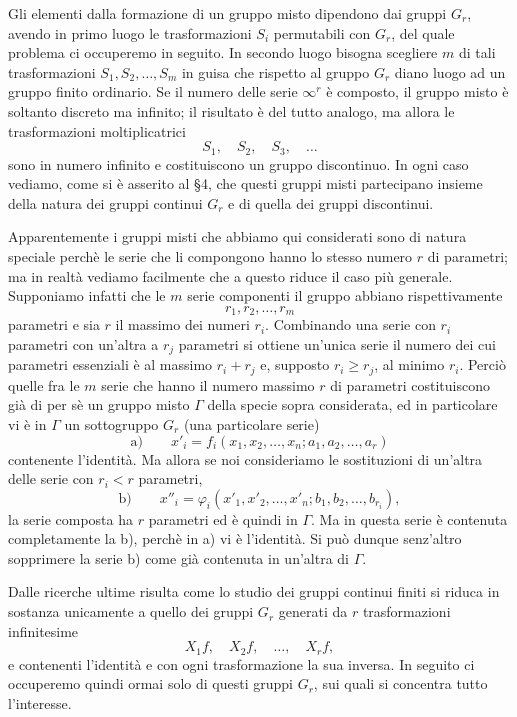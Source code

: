 \documentclass[11pt]{book}
\begin{document}
Gli elementi dalla formazione di un gruppo misto dipendono dai gruppi $G_r$, avendo in primo luogo le trasformazioni $S_i$ permutabili con $G_r$, del quale problema ci occuperemo in seguito. In secondo luogo bisogna scegliere $m$ di tali trasformazioni $S_1,S_2,\ldots,S_m$ in guisa che rispetto al gruppo $G_r$ diano luogo ad un gruppo finito ordinario. Se il numero delle serie $\infty^r$ è composto, il gruppo misto è soltanto discreto ma infinito; il risultato è del tutto analogo, ma allora le trasformazioni moltiplicatrici
\[
 S_1,
 \quad S_2,
 \quad S_3,
 \quad \ldots
\]
sono in numero infinito e costituiscono un gruppo discontinuo. In ogni caso vediamo, come si è asserito al \S{}4, che questi gruppi misti partecipano insieme della natura dei gruppi continui $G_r$ e di quella dei gruppi discontinui.

Apparentemente i gruppi misti che abbiamo qui considerati sono di natura speciale perchè le serie che li compongono hanno lo stesso numero $r$ di parametri; ma in realtà vediamo facilmente che a questo riduce il caso più generale. Supponiamo infatti che le $m$ serie componenti il gruppo abbiano rispettivamente
\[
 r_1,r_2,\ldots,r_m
\]
parametri e sia $r$ il massimo dei numeri $r_i$. Combinando una serie con $r_i$ parametri con un'altra a $r_j$ parametri si ottiene un'unica serie il numero dei cui parametri essenziali è al massimo $r_i+r_j$ e, supposto $r_i\ge r_j$, al minimo $r_i$. Perciò quelle fra le $m$ serie che hanno il numero massimo $r$ di parametri costituiscono già di per sè un gruppo misto $\Gamma$ della specie sopra considerata, ed in particolare vi è in $\Gamma$ un sottogruppo $G_r$ (una particolare serie)
\[
 \text{a)}\qquad x'_i=f_i(x_1,x_2,\ldots,x_n; a_1,a_2,\ldots,a_r)
\]
contenente l'identità. Ma allora se noi consideriamo le sostituzioni di un'altra delle serie con $r_i<r$ parametri,
\[
 \text{b)}\qquad x''_i=\varphi_i(x'_1,x'_2,\ldots,x'_n; b_1,b_2,\ldots,b_{r_i}),
\]
la serie composta ha $r$ parametri ed è quindi in $\Gamma$. Ma in questa serie è contenuta completamente la b), perchè in a) vi è l'identità. Si può dunque senz'altro sopprimere la serie b) come già contenuta in un'altra di $\Gamma$.

Dalle ricerche ultime risulta come lo studio dei gruppi continui finiti si riduca in sostanza unicamente a quello dei gruppi $G_r$ generati da $r$ trasformazioni infinitesime
\[
 X_1f,
 \quad X_2f,
 \quad \ldots,
 \quad X_rf,
\]
e contenenti l'identità e con ogni trasformazione la sua inversa. In seguito ci occuperemo quindi ormai solo di questi gruppi $G_r$, sui quali si concentra tutto l'interesse.
\end{document}
